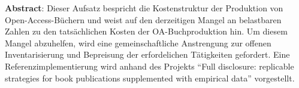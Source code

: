 \textbf{Abstract}: Dieser Aufsatz bespricht die Kostenstruktur der
Produktion von Open-Access-Büchern und weist auf den derzeitigen Mangel
an belastbaren Zahlen zu den tatsächlichen Kosten der OA-Buchproduktion
hin. Um diesem Mangel abzuhelfen, wird eine gemeinschaftliche
Anstrengung zur offenen Inventarisierung und Bepreisung der
erfordelichen Tätigkeiten gefordert. Eine Referenzimplementierung wird
anhand des Projekts ``Full disclosure: replicable strategies for book
publications supplemented with empirical data'' vorgestellt.
